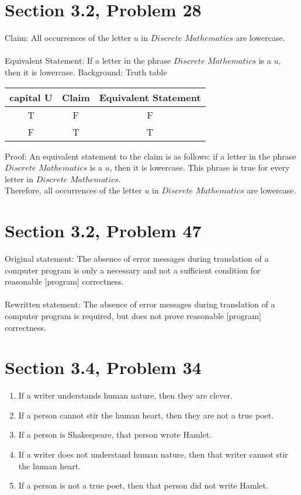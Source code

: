 \documentclass{article}
\begin{document}
\clearpage
\header

\section*{Section 3.2, Problem 28}
Claim: All occurrences of the letter $u$ in $Discrete$ $Mathematics$ are lowercase. \\\\
Equivalent Statement: If a letter in the phrase $Discrete$ $Mathematics$ is a $u$, then it is lowercase.
Background: Truth table
\begin{center}
	\begin{tabular}{|c c c|} 
		\hline
		capital U & Claim & Equivalent Statement \\ [1ex] 
		\hline
		T & F & F \\
		\hline
		F & T & T \\
		\hline
	\end{tabular}
\end{center}
Proof: An equivalent statement to the claim is as follows: if a letter in the phrase $Discrete$ $Mathematics$ is a $u$, then it is lowercase. This phrase is true for every letter in $Discrete$ $Mathematics$. \\
Therefore, all occurrences of the letter $u$ in $Discrete$ $Mathematics$ are lowercase.

\clearpage
\header

\section*{Section 3.2, Problem 47}
Original statement: The absence of error messages during translation of a computer program is only a necessary and not a sufficient condition for reasonable [program] correctness. \\\\
Rewritten statement: The absence of error messages during translation of a computer program is required, but does not prove reasonable [program] correctness.

\clearpage
\header

\section*{Section 3.4, Problem 34}
\begin{enumerate}[1.]
	\item If a writer understands human nature, then they are clever.
	\item If a person cannot stir the human heart, then they are not a true poet.
	\item If a person is Shakespeare, that person wrote Hamlet.
	\item If a writer does not understand human nature, then that writer cannot stir the human heart.
	\item If a person is not a true poet, then that person did not write Hamlet.
\end{enumerate}
\end{document}
